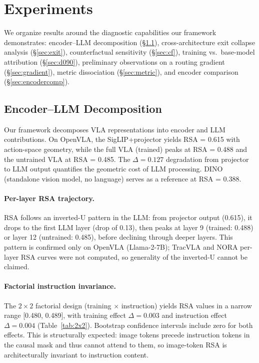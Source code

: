 \documentclass[letterpaper]{article}
\begin{document}
\section{Experiments}

We organize results around the diagnostic capabilities our framework demonstrates: encoder--LLM decomposition (\S\ref{sec:encoder}), cross-architecture exit collapse analysis (\S\ref{sec:exit}), counterfactual sensitivity (\S\ref{sec:cf}), training vs.\ base-model attribution (\S\ref{sec:d090}), preliminary observations on a routing gradient (\S\ref{sec:gradient}), metric dissociation (\S\ref{sec:metric}), and encoder comparison (\S\ref{sec:encodercomp}).

\subsection{Encoder--LLM Decomposition}
\label{sec:encoder}

Our framework decomposes VLA representations into encoder and LLM contributions.
On OpenVLA, the SigLIP+projector yields RSA = 0.615 with action-space geometry, while the full VLA (trained) peaks at RSA = 0.488 and the untrained VLA at RSA = 0.485.
The $\Delta = 0.127$ degradation from projector to LLM output quantifies the geometric cost of LLM processing.
DINO (standalone vision model, no language) serves as a reference at RSA = 0.388.

\paragraph{Per-layer RSA trajectory.}
RSA follows an inverted-U pattern in the LLM: from projector output (0.615), it drops to the first LLM layer (drop of 0.13), then peaks at layer 9 (trained: 0.488) or layer 12 (untrained: 0.485), before declining through deeper layers.
This pattern is confirmed only on OpenVLA (Llama-2-7B); TracVLA and NORA per-layer RSA curves were not computed, so generality of the inverted-U cannot be claimed.

\paragraph{Factorial instruction invariance.}
The $2 \times 2$ factorial design (training $\times$ instruction) yields RSA values in a narrow range [0.480, 0.489], with training effect $\Delta = 0.003$ and instruction effect $\Delta = 0.004$ (Table~\ref{tab:2x2}).
Bootstrap confidence intervals include zero for both effects.
This is structurally expected: image tokens precede instruction tokens in the causal mask and thus cannot attend to them, so image-token RSA is architecturally invariant to instruction content.
\end{document}
